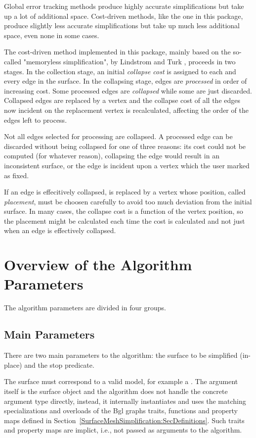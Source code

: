 Global error tracking methods produce highly accurate simplifications but take up a lot of additional space. Cost-driven methods, like the one in this package, produce slightly less accurate simplifications but take up much less additional space, even none in some cases.

The cost-driven method implemented in this package, mainly based on the so-called "memoryless simplification", by Lindstrom and Turk \cite{cgal:lt-fmeps-98,cgal:lt-ems-99}, proceeds in two stages. In the collection stage, an initial {\em collapse cost} is assigned to each and every edge in the surface. In the collapsing stage, edges are {\em processed} in order of increasing cost. Some processed edges are {\em collapsed} while some are just discarded. Collapsed edges are replaced by a vertex and the collapse cost of all the edges now incident on the replacement vertex is recalculated, affecting the order of the edges left to process.

Not all edges selected for processing are collapsed. A processed edge can be discarded without being collapsed for one of three reasons: its cost could not be computed (for whatever reason), collapsing the edge would result in an inconsistent surface, or the edge is incident upon a vertex which the user marked as fixed.

If an edge is effecitively collapsed, is replaced by a vertex whose position, called {\em placement}, must be choosen carefully to avoid too much deviation from the initial surface. In many cases, the collapse cost is a function of the vertex position, so the placement might be calculated each time the cost is calculated and not just when an edge is effectively collapsed.

\section{Overview of the Algorithm Parameters}

The algorithm parameters are divided in four groups.

\subsection{Main Parameters}

There are two main parameters to the algorithm: the surface to be simplified (in-place) and the stop predicate.

The surface must correspond to a valid  model, for example a . The argument itself is the surface object and the algorithm does not handle the concrete argument type directly, instead, it internally instantiates and uses the matching specializations and overloads of the {\sc Bgl} graphs traits, functions and property maps defined in Section~\ref{SurfaceMeshSimplification:SecDefinitions}. Such traits and property maps are implict, i.e., not passed as arguments to the algorithm.

